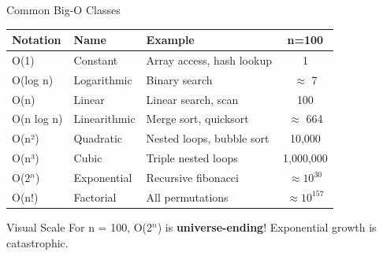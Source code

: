 \documentclass[aspectratio=169,xcolor=dvipsnames]{beamer}
\begin{document}
\begin{frame}{Common Big-O Classes}
  \begin{center}
    \begin{tabular}{l|l|l|c}
      \toprule
      \textbf{Notation} & \textbf{Name} & \textbf{Example} & \textbf{n=100} \\
      \midrule
      O(1) & Constant & Array access, hash lookup & 1 \\
      O(log n) & Logarithmic & Binary search & $\approx$ 7 \\
      O(n) & Linear & Linear search, scan & 100 \\
      O(n log n) & Linearithmic & Merge sort, quicksort & $\approx$ 664 \\
      O(n²) & Quadratic & Nested loops, bubble sort & 10,000 \\
      O(n³) & Cubic & Triple nested loops & 1,000,000 \\
      O(2$^n$) & Exponential & Recursive fibonacci & $\approx 10^{30}$ \\
      O(n!) & Factorial & All permutations & $\approx 10^{157}$ \\
      \bottomrule
    \end{tabular}
  \end{center}

  \vspace{0.5cm}

  \begin{alertblock}{Visual Scale}
    For n = 100, O(2$^n$) is \textbf{universe-ending}! Exponential growth is catastrophic.
  \end{alertblock}
\end{frame}
\end{document}
